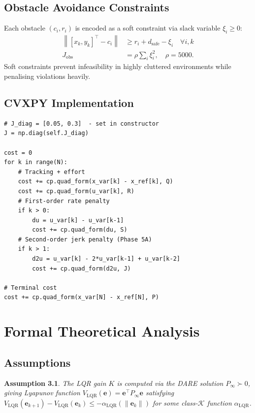 \documentclass[12pt,a4paper,oneside]{report}
\newtheorem{assumption}{Assumption}[chapter]
\newcommand{\norm}[1]{\left\lVert#1\right\rVert}
\begin{document}
\section{Obstacle Avoidance Constraints}

Each obstacle \((c_i, r_i)\) is encoded as a soft constraint via slack
variable \(\xi_i \geq 0\):
\begin{align}
  \norm{[x_k,y_k]^\top - c_i} &\geq r_i + d_{\mathrm{safe}} - \xi_i
    \quad\forall i,k\\
  J_{\mathrm{obs}} &= \rho\sum_i\xi_i^2,\quad \rho=5000.
\end{align}
Soft constraints prevent infeasibility in highly cluttered environments
while penalising violations heavily.

\section{CVXPY Implementation}

\begin{lstlisting}[caption={Second-order jerk penalty in \texttt{mpc\_controller.py}}]
# J_diag = [0.05, 0.3]  - set in constructor
J = np.diag(self.J_diag)

cost = 0
for k in range(N):
    # Tracking + effort
    cost += cp.quad_form(x_var[k] - x_ref[k], Q)
    cost += cp.quad_form(u_var[k], R)
    # First-order rate penalty
    if k > 0:
        du = u_var[k] - u_var[k-1]
        cost += cp.quad_form(du, S)
    # Second-order jerk penalty (Phase 5A)
    if k > 1:
        d2u = u_var[k] - 2*u_var[k-1] + u_var[k-2]
        cost += cp.quad_form(d2u, J)

# Terminal cost
cost += cp.quad_form(x_var[N] - x_ref[N], P)
\end{lstlisting}

\chapter{Formal Theoretical Analysis}\label{ch:theory}

\section{Assumptions}

\begin{assumption}\label{ass:lqr}
  The LQR gain \(K\) is computed via the DARE solution \(P_\infty \succ 0\),
  giving Lyapunov function \(V_{\mathrm{LQR}}(\mathbf{e})=\mathbf{e}^\top P_\infty\mathbf{e}\)
  satisfying
  \(V_{\mathrm{LQR}}(\mathbf{e}_{k+1})-V_{\mathrm{LQR}}(\mathbf{e}_k)
  \leq -\alpha_{\mathrm{LQR}}(\|\mathbf{e}_k\|)\)
  for some class-\(\mathcal{K}\) function \(\alpha_{\mathrm{LQR}}\).
\end{assumption}
\end{document}
